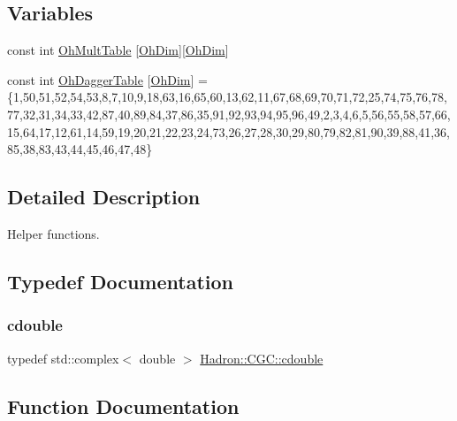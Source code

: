 \subsection*{Variables}
\begin{DoxyCompactItemize}
\item 
const int \mbox{\hyperlink{namespaceHadron_1_1CGC_a7737922afb0c060e8cc522adbb5b2723}{Oh\+Mult\+Table}} \mbox{[}\mbox{\hyperlink{namespaceHadron_a2bea98b7ecd13619ef78b6d204d59707}{Oh\+Dim}}\mbox{]}\mbox{[}\mbox{\hyperlink{namespaceHadron_a2bea98b7ecd13619ef78b6d204d59707}{Oh\+Dim}}\mbox{]}
\item 
const int \mbox{\hyperlink{namespaceHadron_1_1CGC_af366e5e97395d0d95377898177cdbb79}{Oh\+Dagger\+Table}} \mbox{[}\mbox{\hyperlink{namespaceHadron_a2bea98b7ecd13619ef78b6d204d59707}{Oh\+Dim}}\mbox{]} = \{1,50,51,52,54,53,8,7,10,9,18,63,16,65,60,13,62,11,67,68,69,70,71,72,25,74,75,76,78,77,32,31,34,33,42,87,40,89,84,37,86,35,91,92,93,94,95,96,49,2,3,4,6,5,56,55,58,57,66,15,64,17,12,61,14,59,19,20,21,22,23,24,73,26,27,28,30,29,80,79,82,81,90,39,88,41,36,85,38,83,43,44,45,46,47,48\}
\end{DoxyCompactItemize}


\subsection{Detailed Description}
Helper functions. 

\subsection{Typedef Documentation}
\mbox{\label{namespaceHadron_1_1CGC_a52d2b70e6792726fb525eab94daae53b}} 
\subsubsection{\texorpdfstring{cdouble}{cdouble}}
{\footnotesize\ttfamily typedef std\+::complex$<$ double $>$ \mbox{\hyperlink{namespaceHadron_1_1CGC_a52d2b70e6792726fb525eab94daae53b}{Hadron\+::\+C\+G\+C\+::cdouble}}}



\subsection{Function Documentation}
\mbox{\label{namespaceHadron_1_1CGC_a3a95d08c25d8f09a43db0baca8c13e6f}} 
